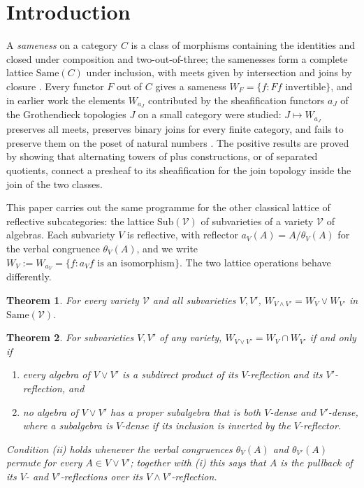 \documentclass[11pt]{amsart}
\newtheorem{thm}{Theorem}[section]
\theoremstyle{definition}
\newcommand{\Same}{\mathrm{Same}}
\newcommand{\Sub}{\mathrm{Sub}}
\newcommand{\sV}{\mathcal V}
\begin{document}
\maketitle

\section{Introduction}

A \emph{sameness} on a category $C$ is a class of morphisms containing the
identities and closed under composition and two-out-of-three; the samenesses
form a complete lattice $\Same(C)$ under inclusion, with meets given by
intersection and joins by closure \cite{Same}. Every functor $F$ out of $C$
gives a sameness $W_F=\{f: Ff\text{ invertible}\}$, and in earlier work the
elements $W_{a_J}$ contributed by the sheafification functors $a_J$ of the
Grothendieck topologies $J$ on a small category were studied: $J\mapsto W_{a_J}$
preserves all meets, preserves binary joins for every finite category, and
fails to preserve them on the poset of natural numbers
\cite{Topjoin,Finitejoin}. The positive results are proved by showing that
alternating towers of plus constructions, or of separated quotients, connect a
presheaf to its sheafification for the join topology inside the join of the two
classes.

This paper carries out the same programme for the other classical lattice of
reflective subcategories: the lattice $\Sub(\sV)$ of subvarieties of a variety
$\sV$ of algebras. Each subvariety $V$ is reflective, with reflector
$a_V(A)=A/\theta_V(A)$ for the verbal congruence $\theta_V(A)$, and we write
$W_V:=W_{a_V}=\{f:a_Vf\text{ is an isomorphism}\}$. The two lattice operations
behave differently.

\begin{thm}\label{thm:A}
For every variety $\sV$ and all subvarieties $V,V'$,
$W_{V\wedge V'}=W_V\vee W_{V'}$ in $\Same(\sV)$.
\end{thm}

\begin{thm}\label{thm:B}
For subvarieties $V,V'$ of any variety, $W_{V\vee V'}=W_V\cap W_{V'}$ if and only if
\begin{enumerate}
\item[(i)] every algebra of $V\vee V'$ is a subdirect product of its $V$-reflection and
its $V'$-reflection, and
\item[(ii)] no algebra of $V\vee V'$ has a proper subalgebra that is both $V$-dense and
$V'$-dense, where a subalgebra is $V$-dense if its inclusion is inverted by the
$V$-reflector.
\end{enumerate}
Condition (ii) holds whenever the verbal congruences $\theta_V(A)$ and $\theta_{V'}(A)$
permute for every $A\in V\vee V'$; together with (i) this says that $A$ is the pullback
of its $V$- and $V'$-reflections over its $V\wedge V'$-reflection.
\end{thm}
\end{document}
